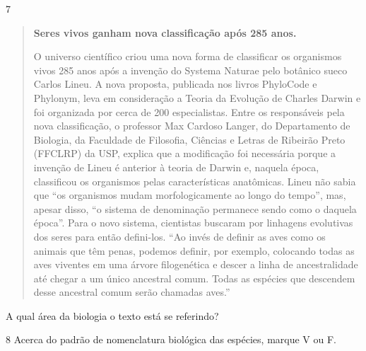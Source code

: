 \num{7}

\begin{quote}
\textbf{Seres vivos ganham nova classificação após 285 anos.}

O universo científico criou uma nova forma de classificar os organismos
vivos 285 anos após a invenção do Systema Naturae pelo botânico sueco
Carlos Lineu. A nova proposta, publicada nos livros PhyloCode e
Phylonym, leva em consideração a Teoria da Evolução de Charles Darwin e
foi organizada por cerca de 200 especialistas. Entre os responsáveis
pela nova classificação, o professor Max Cardoso Langer, do Departamento
de Biologia, da Faculdade de Filosofia, Ciências e Letras de Ribeirão
Preto (FFCLRP) da USP, explica que a modificação foi necessária porque a
invenção de Lineu é anterior à teoria de Darwin e, naquela época,
classificou os organismos pelas características anatômicas. Lineu não
sabia que ``os organismos mudam morfologicamente ao longo do tempo'',
mas, apesar disso, ``o sistema de denominação permanece sendo como o
daquela época''. Para o novo sistema, cientistas buscaram por linhagens
evolutivas dos seres para então defini-los. ``Ao invés de definir as
aves como os animais que têm penas, podemos definir, por exemplo,
colocando todas as aves viventes em uma árvore filogenética e descer a
linha de ancestralidade até chegar a um único ancestral comum. Todas as
espécies que descendem desse ancestral comum serão chamadas aves.''

\end{quote}

A qual área da biologia o texto está se referindo?



\num{8}  Acerca do padrão de nomenclatura biológica das espécies, marque V ou F.

